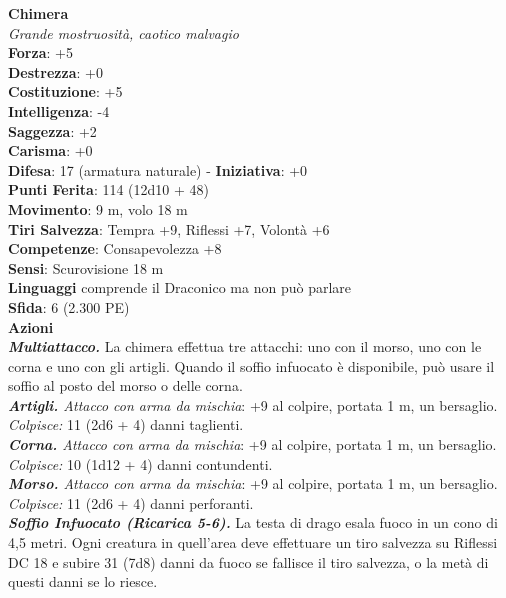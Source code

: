 \begin{multicols}{2}
\medskip\textbf{Chimera}\\
\emph{Grande mostruosità, caotico malvagio}\\
\textbf{Forza}: +5\\
\textbf{Destrezza}: +0\\
\textbf{Costituzione}: +5\\
\textbf{Intelligenza}: -4\\
\textbf{Saggezza}: +2\\
\textbf{Carisma}: +0\\
\textbf{Difesa}: 17 (armatura naturale) - \textbf{Iniziativa}: +0\\
\textbf{Punti Ferita}: 114 (12d10 + 48)\\
\textbf{Movimento}: 9 m, volo 18 m\\
\textbf{Tiri Salvezza}: Tempra +9, Riflessi +7, Volontà +6\\
\textbf{Competenze}: Consapevolezza +8\\
\textbf{Sensi}: Scurovisione 18 m\\
\textbf{Linguaggi} comprende il Draconico ma non può parlare\\
\textbf{Sfida}: 6 (2.300 PE)\smallskip\\
\smallskip\textbf{Azioni}\\
\emph{\textbf{Multiattacco.}} La chimera effettua tre attacchi: uno con il morso, uno con le corna e uno con gli artigli. Quando il soffio infuocato è disponibile, può usare il soffio al posto del morso o delle corna.\\
\emph{\textbf{Artigli.} Attacco con arma da mischia}: +9 al colpire, portata 1 m, un bersaglio. \\
\emph{Colpisce:} 11 (2d6 + 4) danni taglienti.\\
\emph{\textbf{Corna.} Attacco con arma da mischia}: +9 al colpire, portata 1 m, un bersaglio.\\
\emph{Colpisce:} 10 (1d12 + 4) danni contundenti.\\
\emph{\textbf{Morso.} Attacco con arma da mischia}: +9 al colpire, portata 1 m, un bersaglio.\\
\emph{Colpisce:} 11 (2d6 + 4) danni perforanti.\\
\emph{\textbf{Soffio Infuocato (Ricarica 5-6).}} La testa di drago esala fuoco in un cono di 4,5 metri. Ogni creatura in quell'area deve effettuare un tiro salvezza su Riflessi DC  18 e subire 31 (7d8) danni da fuoco se fallisce il tiro salvezza, o la metà di questi danni se lo riesce.\\

\end{multicols}
